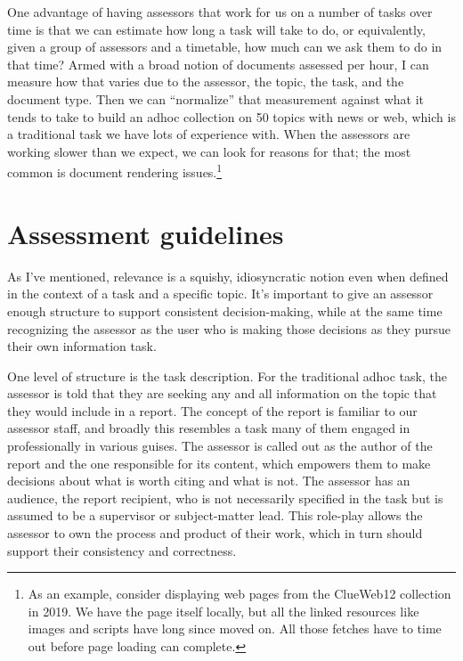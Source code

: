 \documentclass[nobib]{tufte-book}
\begin{document}
One advantage of having assessors that work for us on a number of tasks over time is that we can estimate how long a task will take to do, or equivalently, given a group of assessors and a timetable, how much can we ask them to do in that time?  Armed with a broad notion of documents assessed per hour, I can measure how that varies due to the assessor, the topic, the task, and the document type.  Then we can ``normalize'' that measurement against what it tends to take to build an adhoc collection on 50 topics with news or web, which is a traditional task we have lots of experience with.  When the assessors are working slower than we expect, we can look for reasons for that; the most common is document rendering issues.\footnote{As an example, consider displaying web pages from the ClueWeb12 collection in 2019.  We have the page itself locally, but all the linked resources like images and scripts have long since moved on.  All those fetches have to time out before page loading can complete.}

\section{Assessment guidelines}

As I've mentioned, relevance is a squishy, idiosyncratic notion even when defined in the context of a task and a specific topic.  It's important to give an assessor enough structure to support consistent decision-making, while at the same time recognizing the assessor as the user who is making those decisions as they pursue their own information task.

One level of structure is the task description.  For the traditional adhoc task, the assessor is told that they are seeking any and all information on the topic that they would include in a report.  The concept of the report is familiar to our assessor staff, and broadly this resembles a task many of them engaged in professionally in various guises.  The assessor is called out as the author of the report and the one responsible for its content, which empowers them to make decisions about what is worth citing and what is not. The assessor has an audience, the report recipient, who is not necessarily specified in the task but is assumed to be a supervisor or subject-matter lead.  This role-play allows the assessor to own the process and product of their work, which in turn should support their consistency and correctness.
\end{document}
